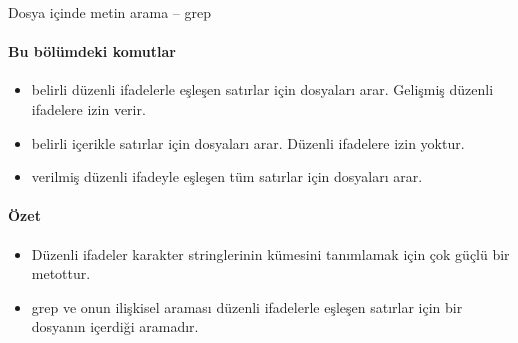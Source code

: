 \begin{section}{Dosya içinde metin arama – grep}
\paragraph{Bu bölümdeki komutlar}{
\begin{itemize}
\item[egrep]belirli düzenli ifadelerle eşleşen satırlar için dosyaları arar. Gelişmiş düzenli ifadelere izin verir.
\item[fgrep]belirli içerikle satırlar için dosyaları arar. Düzenli ifadelere izin yoktur.
\item[grep]verilmiş düzenli ifadeyle eşleşen tüm satırlar için dosyaları arar.
\end{itemize}}

\paragraph{Özet}{
\begin{itemize}
 \item Düzenli ifadeler karakter stringlerinin kümesini tanımlamak için çok güçlü bir metottur.
 \item grep ve onun ilişkisel araması düzenli ifadelerle eşleşen satırlar için bir dosyanın içerdiği aramadır.
\end{itemize}}

\end{section}